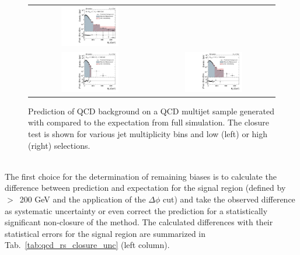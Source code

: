 \begin{figure}[!hp]
\begin{tabular}{cc}
                \includegraphics[width=0.49\textwidth]{figures/MHT_JetBin3_HThigh_madgraph_DR53X_chs_TuneZ2star_pt10_withoutPUReweighting_UseRebCorrection_v1.pdf}\\
                \includegraphics[width=0.49\textwidth]{figures/MHT_JetBin4_HTlow_madgraph_DR53X_chs_TuneZ2star_pt10_withoutPUReweighting_UseRebCorrection_v1.pdf} &
                \includegraphics[width=0.49\textwidth]{figures/MHT_JetBin4_HThigh_madgraph_DR53X_chs_TuneZ2star_pt10_withoutPUReweighting_UseRebCorrection_v1.pdf}\\

  \end{tabular}
  \caption{Prediction of QCD background on a QCD multijet sample generated with \madgraph compared to the expectation from full simulation. The closure test is shown for various jet multiplicity bins and low (left) or high (right) \HT selections.}
  \label{fig:qcd_rs_closure}
\end{figure}
\\
The first choice for the determination of remaining biases is to calculate the difference between prediction and expectation for the signal region (defined by \MHT $>$~200 GeV and the application of the $\Delta \phi$ cut) and take the observed difference as systematic uncertainty or even correct the prediction for a statistically significant non-closure of the method. The calculated differences with their statistical errors for the signal region are summarized in Tab.~\ref{tab:qcd_rs_closure_unc} (left column). 
